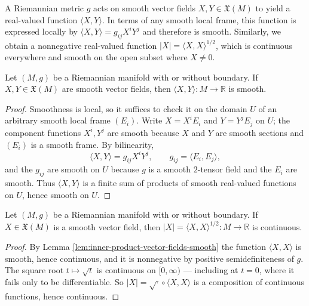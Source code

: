 A Riemannian metric $g$ acts on smooth vector fields $X, Y \in \mathfrak{X}(M)$ to yield a real-valued function $\langle X,Y \rangle$. In terms of any smooth local frame, this function is expressed locally by $\langle X,Y \rangle = g_{ij} X^i Y^j$ and therefore is smooth. Similarly, we obtain a nonnegative real-valued function $|X| = \langle X,X \rangle^{1/2}$, which is continuous everywhere and smooth on the open subset where $X \neq 0$.

\begin{lemma}
\label{lem:inner-product-vector-fields-smooth}
\leanok
{}
Let $(M,g)$ be a Riemannian manifold with or without boundary. If $X, Y \in \mathfrak{X}(M)$ are smooth vector fields, then $\langle X, Y \rangle : M \to \mathbb{R}$ is smooth.
\end{lemma}

\begin{proof}
\leanok
{}
Smoothness is local, so it suffices to check it on the domain $U$ of an arbitrary smooth local frame $(E_i)$. Write $X = X^i E_i$ and $Y = Y^j E_j$ on $U$; the component functions $X^i, Y^j$ are smooth because $X$ and $Y$ are smooth sections and $(E_i)$ is a smooth frame. By bilinearity,
\[
\langle X, Y\rangle = g_{ij} X^i Y^j , \qquad g_{ij} = \langle E_i, E_j\rangle ,
\]
and the $g_{ij}$ are smooth on $U$ because $g$ is a smooth $2$-tensor field and the $E_i$ are smooth. Thus $\langle X, Y\rangle$ is a finite sum of products of smooth real-valued functions on $U$, hence smooth on $U$.
\end{proof}

\begin{lemma}
\label{lem:length-vector-field-continuous}
\leanok
{}
Let $(M,g)$ be a Riemannian manifold with or without boundary. If $X \in \mathfrak{X}(M)$ is a smooth vector field, then $|X| = \langle X, X\rangle^{1/2} : M \to \mathbb{R}$ is continuous.
\end{lemma}

\begin{proof}
\leanok
{}
By Lemma \ref{lem:inner-product-vector-fields-smooth} the function $\langle X, X\rangle$ is smooth, hence continuous, and it is nonnegative by positive semidefiniteness of $g$. The square root $t \mapsto \sqrt{t}$ is continuous on $[0,\infty)$ — including at $t = 0$, where it fails only to be differentiable. So $|X| = \sqrt{\cdot} \circ \langle X, X\rangle$ is a composition of continuous functions, hence continuous.
\end{proof}


